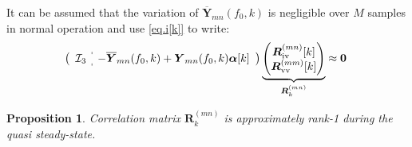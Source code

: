 \documentclass[twocolumn]{IEEEtran}
\newcommand{\bs}{\boldsymbol}
\newtheorem{prop}{Proposition}
\begin{document}
It can be assumed that the variation of $\overline{\bs Y}_{mn}(f_0,k)$ is negligible over $M$ samples in normal operation and use \eqref{eq.i[k]} to write:
\begin{align}
\nonumber
\! \! \left( \begin{array}{c:c}
\mathcal{I}_3 &
-\overline{\bs Y}_{mn}(f_0,k)+{\bs Y}_{mn}(f_0,k)\bs{\alpha}[k] 
\end{array}\right)
\underbrace{
 \begin{pmatrix}
  \bs R^{(mn)}_{\rm iv}[k]\\
    \bs R^{(mm)}_{\rm vv}[k]
 \end{pmatrix}
 }_{\bs R^{(mn)}_k}
\approx\bs 0
\label{eq.homog1}
\end{align}
 \begin{prop}
 \label{prop.Rk1}
Correlation matrix $\bs R^{(mn)}_k$ is approximately rank-1 during the quasi steady-state. 
 \end{prop}
\end{document}
